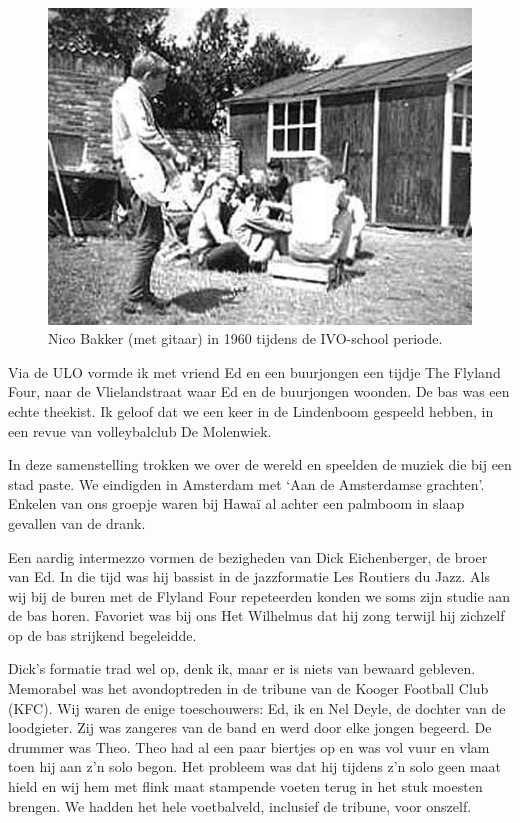 \documentclass[12pt,twoside, openright]{memoir}
\begin{document}
\begin{figure}
\centering
\includegraphics[width=\textwidth]{img/ch25/nico}
\caption*{\footnotesize Nico Bakker (met gitaar) in 1960 tijdens de IVO-school periode.}
\end{figure}

Via de ULO vormde ik met vriend Ed en een buurjongen een tijdje The Flyland Four, naar de Vlielandstraat waar Ed en de buurjongen woonden. De bas was een echte theekist. Ik geloof dat we een keer in de Lindenboom gespeeld hebben, in een revue van volleybalclub De Molenwiek. 

In deze samenstelling trokken we over de wereld en speelden de muziek die bij een stad paste. We eindigden in Amsterdam met `Aan de Amsterdamse grachten'. Enkelen van ons groepje waren bij Hawaï al achter een palmboom in slaap gevallen van de drank.   

Een aardig intermezzo vormen de bezigheden van Dick Eichenberger, de broer van Ed. In die tijd was hij bassist in de jazzformatie Les Routiers du Jazz. Als wij bij de buren met de Flyland Four repeteerden konden we soms zijn studie aan de bas horen. Favoriet was bij ons Het Wilhelmus dat hij zong terwijl hij zichzelf op de bas strijkend begeleidde. 

Dick's formatie trad wel op, denk ik, maar er is niets van bewaard gebleven. Memorabel was het avondoptreden in de tribune van de Kooger Football Club (KFC). Wij waren de enige toeschouwers: Ed, ik en Nel Deyle, de dochter van de loodgieter. Zij was zangeres van de band en werd door elke jongen begeerd. De drummer was Theo. Theo had al een paar biertjes op en was vol vuur en vlam toen hij aan z’n solo begon. Het probleem was dat hij tijdens z’n solo geen maat hield en wij hem met flink maat stampende voeten terug in het stuk moesten brengen. We hadden het hele voetbalveld, inclusief de tribune, voor onszelf. 
\end{document}
